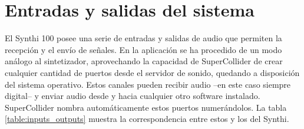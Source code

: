 \section{Entradas y salidas del sistema}

El Synthi 100 posee una serie de entradas y salidas de audio que permiten la recepción y el envío de señales. En la aplicación se ha procedido de un modo análogo al sintetizador, aprovechando la capacidad de SuperCollider de crear cualquier cantidad de puertos desde el servidor de sonido, quedando a disposición del sistema operativo. Estos canales pueden recibir audio --en este caso siempre digital-- y enviar audio desde y hacia cualquier otro software instalado. SuperCollider nombra automáticamente estos puertos numerándolos. La tabla \ref{table:inputs_outputs} muestra la correspondencia entre estos y los del Synthi. 

